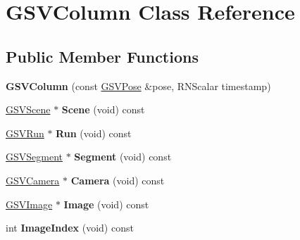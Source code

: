\hypertarget{class_g_s_v_column}{}\section{G\+S\+V\+Column Class Reference}
\label{class_g_s_v_column}
\subsection*{Public Member Functions}
\begin{DoxyCompactItemize}
\item 
{\bfseries G\+S\+V\+Column} (const \hyperlink{class_g_s_v_pose}{G\+S\+V\+Pose} \&pose, R\+N\+Scalar timestamp)\hypertarget{class_g_s_v_column_a8b1dc0ce0a70ed9c3c507446b9f8c24b}{}\label{class_g_s_v_column_a8b1dc0ce0a70ed9c3c507446b9f8c24b}

\item 
\hyperlink{class_g_s_v_scene}{G\+S\+V\+Scene} $\ast$ {\bfseries Scene} (void) const \hypertarget{class_g_s_v_column_aa8b0da474f443be47e0e656e3a1c0abe}{}\label{class_g_s_v_column_aa8b0da474f443be47e0e656e3a1c0abe}

\item 
\hyperlink{class_g_s_v_run}{G\+S\+V\+Run} $\ast$ {\bfseries Run} (void) const \hypertarget{class_g_s_v_column_a9349b42b2395b6374ec7a1a0fa726d99}{}\label{class_g_s_v_column_a9349b42b2395b6374ec7a1a0fa726d99}

\item 
\hyperlink{class_g_s_v_segment}{G\+S\+V\+Segment} $\ast$ {\bfseries Segment} (void) const \hypertarget{class_g_s_v_column_a437a1503b44469d08840d81e53921c64}{}\label{class_g_s_v_column_a437a1503b44469d08840d81e53921c64}

\item 
\hyperlink{class_g_s_v_camera}{G\+S\+V\+Camera} $\ast$ {\bfseries Camera} (void) const \hypertarget{class_g_s_v_column_aa54bbb831004b5916253d48ec129506b}{}\label{class_g_s_v_column_aa54bbb831004b5916253d48ec129506b}

\item 
\hyperlink{class_g_s_v_image}{G\+S\+V\+Image} $\ast$ {\bfseries Image} (void) const \hypertarget{class_g_s_v_column_abf1cc0db0a2eca740cf0c6fda7bafdb1}{}\label{class_g_s_v_column_abf1cc0db0a2eca740cf0c6fda7bafdb1}

\item 
int {\bfseries Image\+Index} (void) const \hypertarget{class_g_s_v_column_ac648c0c6af8bd2a737d3d88058b4584b}{}\label{class_g_s_v_column_ac648c0c6af8bd2a737d3d88058b4584b}


\end{DoxyCompactItemize}
